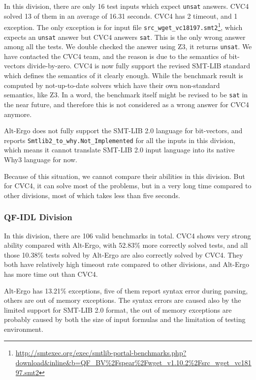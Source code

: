 \documentclass[10pt,letter]{article}
\theoremstyle{definition}
\begin{document}
In this division, there are only 16 test inputs which expect  {\tt unsat} answers. CVC4 solved 13 of them in an average of 16.31 seconds. CVC4 has 2 timeout, and 1 exception. The only exception is for input file {\tt src_wget_vc18197.smt2}\footnote{\url{http://smtexec.org/exec/smtlib-portal-benchmarks.php?download&inline&b=QF_BV\%2Fspear\%2Fwget_v1.10.2\%2Fsrc_wget_vc18197.smt2}}, which expects an {\tt unsat} answer but CVC4 answers {\tt sat}. This is the only wrong answer among all the tests. We double checked the answer using Z3\cite{de2008z3}, it returns {\tt unsat}. We have contacted the CVC4 team, and the reason is due to the semantics of bit-vectors divide-by-zero. CVC4 is now fully support the revised SMT-LIB standard which defines the semantics of it clearly enough. While the benchmark result is computed by not-up-to-date solvers which have their own non-standard semantics, like Z3. In a word, the benchmark itself might be revised to be {\tt sat} in the near future, and therefore this is not considered as a wrong answer for CVC4 anymore.

Alt-Ergo does not fully support the SMT-LIB 2.0 language for bit-vectors, and reports {\tt Smtlib2_to_why.Not_Implemented} for all the inputs in this division, which means it cannot translate SMT-LIB 2.0 input language into its native Why3 language\cite{bobot:why3:2011} for now.

Because of this situation, we cannot compare their abilities in this division. But for CVC4, it can solve most of the problems, but in a very long time compared to other divisions, most of which takes less than five seconds.

\subsubsection{QF-IDL Division}

In this division, there are 106 valid benchmarks in total. CVC4 shows very strong ability compared with Alt-Ergo, with 52.83\% more correctly solved tests, and all those 10.38\% tests solved by Alt-Ergo are also correctly solved by CVC4. They both have relatively high timeout rate compared to other divisions, and Alt-Ergo has more time out than CVC4.

Alt-Ergo has 13.21\% exceptions, five of them report syntax error during parsing, others are out of memory exceptions. The syntax errors are caused also by the limited support for SMT-LIB 2.0 format, the out of memory exceptions are probably caused by both the size of input formulas and the limitation of testing environment.
\end{document}
